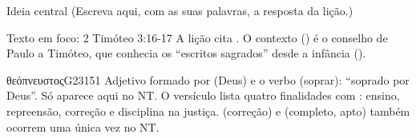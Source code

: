 \begin{campo}{Ideia central}
(Escreva aqui, com as suas palavras, a resposta da lição.)
\end{campo}

\begin{campo}{Texto em foco: 2 Timóteo 3:16-17}
A lição cita . O contexto () é o conselho de Paulo a
Timóteo, que conhecia os \enquote{escritos sagrados} desde a infância
().


\begin{lexico}{θεόπνευστος}{G2315}{1}
Adjetivo formado por  (Deus) e o verbo  (soprar):
\enquote{soprado por Deus}. Só aparece aqui no NT. O versículo lista quatro
finalidades com : ensino, repreensão, correção e disciplina na
justiça.  (correção) e  (completo, apto) também
ocorrem uma única vez no NT.
\end{lexico}
\end{campo}

